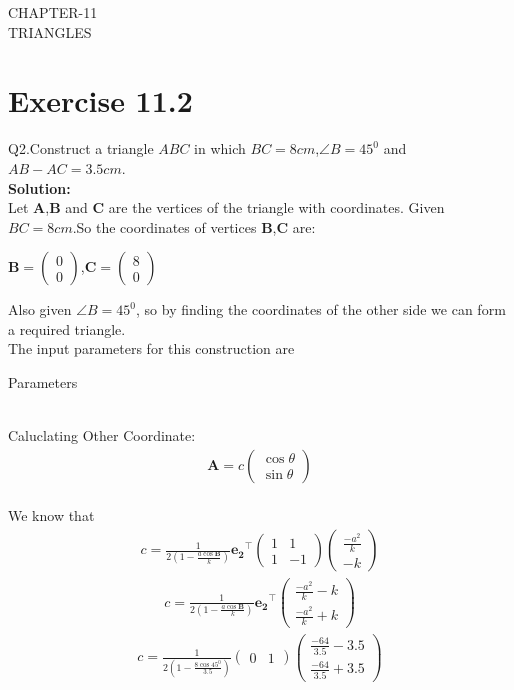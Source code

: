 \documentclass{article}
\newcommand{\myvec}[1]{\ensuremath{\begin{pmatrix}#1\end{pmatrix}}}
\let\vec\mathbf
\begin{document}
\begin{center}
        \textbf\large{CHAPTER-11 \\ TRIANGLES}
\end{center}
\section{Exercise 11.2}
Q2.Construct a triangle $ABC$ in which $BC=8cm$,$\angle{B}=45^0$ and $AB-AC=3.5cm$. \\
\textbf{Solution:}\\
Let $\vec{A}$,$\vec{B}$ and $\vec{C}$ are the vertices of the triangle with coordinates.
Given $BC=8cm$.So the coordinates of vertices $\vec{B}$,$\vec{C}$ are:
\begin{center}
{
$\vec{B} =\myvec{0\\0}$,$\vec{C} =\myvec{8\\0}$
}
\end{center}
Also given $\angle{B}=45^0$, so by finding the coordinates of the other side we can form a required triangle. \\
 The input parameters for this construction are
 \begin{table}[h]
	  \centering
	  
	  \caption{Parameters}
	  \label{tab:Table1}
\end{table}\\
Caluclating Other Coordinate:
  \begin{align}
	  \vec{A} = c\myvec{\cos \theta\\\sin\theta}
	  \end{align}\\
We know that\\
\begin{align}  
      c    
        =
	\frac{1}{2(1-\frac{a\cos\vec{B}}{k})}
	 \vec{e_2}^{\top}
	\myvec{1 & 1\\1 & -1}
	\myvec{\frac{-a^2}{k}\\-k}
     \end{align}
  \begin{align}
        c
	  =
         \frac{1}{2(1-\frac{a\cos\vec{B}}{k})}
	  \vec{e_2}^{\top}
	  \myvec{\frac{-a^2}{k}-k\\\frac{-a^2}{k}+k}
  \end{align}
\begin{align}
        c
         =
         \frac{1}{2(1-\frac{8\cos45^0}{3.5})}
	  \myvec{0 & 1}
	\myvec{\frac{-64}{3.5}-3.5\\\frac{-64}{3.5}+3.5}
  \end{align}	
\end{document}
